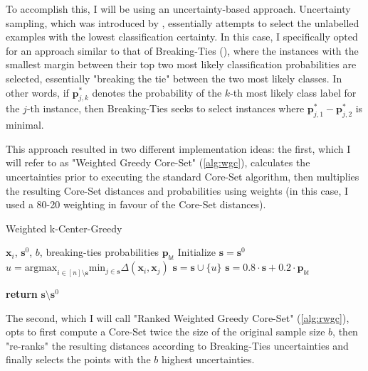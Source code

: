 \documentclass[english,bachelor,ul]{webisthesis} %
\begin{document}
To accomplish this, I will be using an uncertainty-based approach. Uncertainty sampling, which was introduced by \cite{DBLP:conf/sigir/LewisG94}, essentially attempts to select the unlabelled examples with the lowest classification certainty. In this case, I specifically opted for an approach similar to that of Breaking-Ties (\cite{DBLP:journals/jmlr/LuoKGHSRH05}), where the instances with the smallest margin between their top two most likely classification probabilities are selected, essentially "breaking the tie" between the two most likely classes. In other words, if $ \mathbf{p}_{j, k}^* $ denotes the probability of the $ k $-th most likely class label for the $ j $-th instance, then Breaking-Ties seeks to select instances where $ \mathbf{p}_{j, 1}^* - \mathbf{p}_{j, 2}^* $ is minimal.

This approach resulted in two different implementation ideas: the first, which I will refer to as "Weighted Greedy Core-Set" (\ref{alg:wgc}), calculates the uncertainties prior to executing the standard Core-Set algorithm, then multiplies the resulting Core-Set distances and probabilities using weights (in this case, I used a 80-20 weighting in favour of the Core-Set distances). 

\begin{algorithm}
\caption{Weighted k-Center-Greedy}%
\makeatletter{}\makeatother
\label{alg:wgc}
\begin{algorithmic}


\Require $ \mathbf{x}_i $, $ \mathbf{s}^0 $, $ b $, breaking-ties probabilities $ \mathbf{p}_{bt} $
\State Initialize $ \mathbf{s} = \mathbf{s}^0 $
\Repeat
\State $ u = \text{argmax}_{i \in [n] \setminus \mathbf{s}} \text{min}_{j \in \mathbf{s}} \Delta(\mathbf{x}_i, \mathbf{x}_j) $
\State $ \mathbf{s} = \mathbf{s} \cup \{u\} $
\State $ \mathbf{s} = 0.8 \cdot \mathbf{s}  + 0.2 \cdot \mathbf{p}_{bt} $

\State \textbf{return} $\mathbf{s} \setminus \mathbf{s}^0 $
\end{algorithmic}
\end{algorithm}

The second, which I will call "Ranked Weighted Greedy Core-Set" (\ref{alg:rwgc}), opts to first compute a Core-Set twice the size of the original sample size $b$, then "re-ranks" the resulting distances according to Breaking-Ties uncertainties and finally selects the points with the $b$ highest uncertainties.
\end{document}

